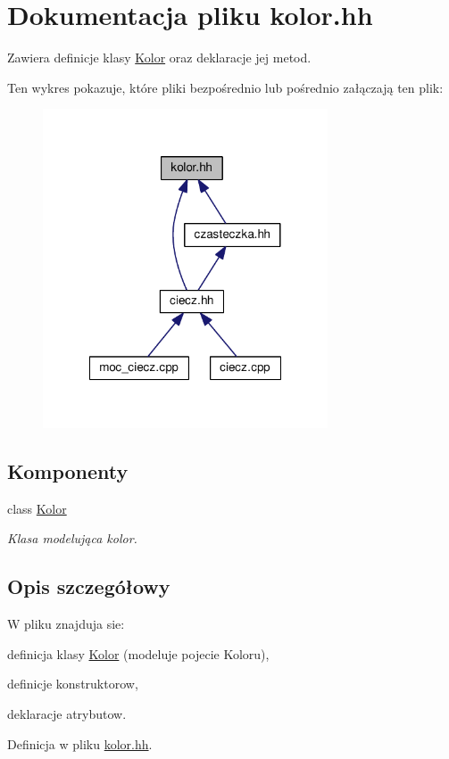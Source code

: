\hypertarget{kolor_8hh}{\section{Dokumentacja pliku kolor.\-hh}
\label{kolor_8hh}
}


Zawiera definicje klasy \hyperlink{class_kolor}{Kolor} oraz deklaracje jej metod.  


Ten wykres pokazuje, które pliki bezpośrednio lub pośrednio załączają ten plik\-:\nopagebreak
\begin{figure}[H]
\begin{center}
\leavevmode
\includegraphics[width=239pt]{kolor_8hh__dep__incl}
\end{center}
\end{figure}
\subsection*{Komponenty}
\begin{DoxyCompactItemize}
\item 
class \hyperlink{class_kolor}{Kolor}
\begin{DoxyCompactList}\small\item\em Klasa modelująca kolor. \end{DoxyCompactList}\end{DoxyCompactItemize}


\subsection{Opis szczegółowy}
W pliku znajduja sie\-:
\begin{DoxyItemize}
\item definicja klasy \hyperlink{class_kolor}{Kolor} (modeluje pojecie Koloru),
\item definicje konstruktorow,
\item deklaracje atrybutow. 
\end{DoxyItemize}

Definicja w pliku \hyperlink{kolor_8hh_source}{kolor.\-hh}.


